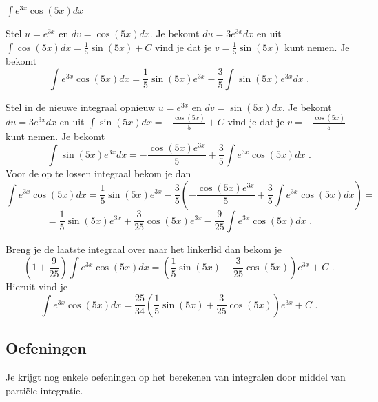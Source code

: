 \begin{voorbeeld}
	$\int e^{3x}\cos (5x)dx$

Stel $u=e^{3x}$ en $dv=\cos (5x)dx$.
Je bekomt $du=3e^{3x}dx$ en uit $\int \cos (5x)dx=\frac{1}{5} \sin (5x)+C$ vind je dat je $v=\frac{1}{5} \sin (5x)$ kunt nemen.
Je bekomt
\[
\int e^{3x}\cos (5x)dx=\frac{1}{5}\sin (5x)e^{3x}-\frac{3}{5}\int \sin (5x)e^{3x}dx \text { .}
\]

Stel in de nieuwe integraal opnieuw $u=e^{3x}$ en $dv=\sin (5x)dx$.
Je bekomt $du=3e^{3x}dx$ en uit $\int \sin (5x)dx=-\frac {\cos (5x)}{5}+C$ vind je dat je $v=-\frac {\cos (5x)}{5}$ kunt nemen.
Je bekomt
\[
\int \sin (5x)e^{3x}dx=-\frac {\cos (5x)e^{3x}}{5}+\frac{3}{5}\int e^{3x}\cos (5x)dx \text { .}
\]
Voor de op te lossen integraal bekom je dan
\[
\int e^{3x}\cos (5x)dx=\frac{1}{5}\sin (5x)e^{3x}-\frac{3}{5} \left(  -\frac {\cos (5x)e^{3x}}{5}+\frac{3}{5}\int e^{3x}\cos (5x)dx  \right)=
\]
\[
=\frac{1}{5}\sin (5x)e^{3x}+\frac{3}{25} \cos (5x)e^{3x}-\frac{9}{25}\int e^{3x}\cos (5x)dx \text { .}
\]

Breng je de laatste integraal over naar het linkerlid dan bekom je
\[
\left( 1+\frac{9}{25}  \right) \int e^{3x}\cos (5x)dx = \left(  \frac{1}{5}\sin (5x)+\frac{3}{25} \cos (5x)  \right)e^{3x}+C \text { .}
\]
Hieruit vind je
\[
\int e^{3x}\cos (5x)dx=\frac{25}{34} \left( \frac{1}{5}\sin (5x)+\frac{3}{25} \cos (5x)   \right)e^{3x}+C \text { .}
\]

\end{voorbeeld}

\subsection{Oefeningen}

Je krijgt nog enkele oefeningen op het berekenen van integralen door middel van parti\"ele integratie.

